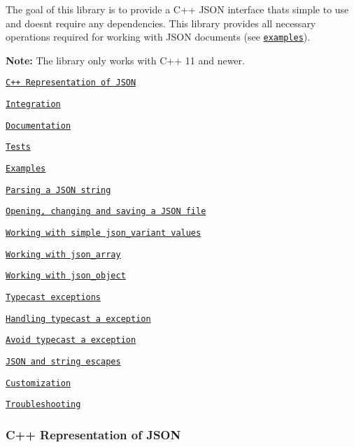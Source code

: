 The goal of this library is to provide a C++ J\+S\+ON interface that\textquotesingle{}s simple to use and doesn\textquotesingle{}t require any dependencies. This library provides all necessary operations required for working with J\+S\+ON documents (see \href{#expamles_section}{\tt examples}).

{\bfseries Note\+:} The library only works with C++ 11 and newer.


\begin{DoxyItemize}
\item \href{#cpp_representation_section}{\tt C++ Representation of J\+S\+ON}
\item \href{#integration_section}{\tt Integration}
\item \href{#doc_section}{\tt Documentation}
\item \href{#tests_section}{\tt Tests}
\item \href{#expamles_section}{\tt Examples}
\begin{DoxyItemize}
\item \href{#parsing_json_string_section}{\tt Parsing a J\+S\+ON string}
\item \href{#opening_changing_section}{\tt Opening, changing and saving a J\+S\+ON file}
\item \href{#working_with_simple_section}{\tt Working with simple json\+\_\+variant values}
\item \href{#working_with_json_array_section}{\tt Working with json\+\_\+array}
\item \href{#working_with_json_object_section}{\tt Working with json\+\_\+object}
\item \href{#typecast_exceptions_section}{\tt Typecast exceptions}
\begin{DoxyItemize}
\item \href{#handling_typecast_expception_section}{\tt Handling typecast a exception}
\item \href{#avoid_typecast_exception_section}{\tt Avoid typecast a exception}
\end{DoxyItemize}
\item \href{#json_and_string_escapes_section}{\tt J\+S\+ON and string escapes}
\end{DoxyItemize}
\item \href{#customization_section}{\tt Customization}
\item \href{#troubleshooting_section}{\tt Troubleshooting}
\end{DoxyItemize}

\subsubsection*{\label{_cpp_representation_section}%
C++ Representation of J\+S\+ON}


